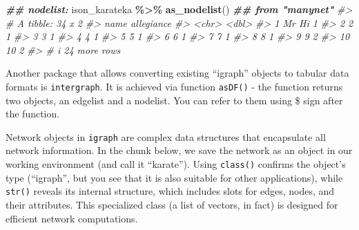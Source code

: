 \documentclass[
]{book}
\newenvironment{Shaded}{\begin{snugshade}}{\end{snugshade}}
\newcommand{\CommentTok}[1]{\textcolor[rgb]{0.56,0.35,0.01}{\textit{#1}}}
\newcommand{\DocumentationTok}[1]{\textcolor[rgb]{0.56,0.35,0.01}{\textbf{\textit{#1}}}}
\newcommand{\FunctionTok}[1]{\textcolor[rgb]{0.13,0.29,0.53}{\textbf{#1}}}
\newcommand{\NormalTok}[1]{#1}
\newcommand{\SpecialCharTok}[1]{\textcolor[rgb]{0.81,0.36,0.00}{\textbf{#1}}}
\begin{document}
\begin{Shaded}
\begin{Highlighting}[]
\DocumentationTok{\#\# nodelist:}
\NormalTok{ison\_karateka }\SpecialCharTok{\%\textgreater{}\%} 
  \FunctionTok{as\_nodelist}\NormalTok{() }\DocumentationTok{\#\# from "manynet"}
\CommentTok{\#\textgreater{} \# A tibble: 34 x 2}
\CommentTok{\#\textgreater{}    name  allegiance}
\CommentTok{\#\textgreater{}    \textless{}chr\textgreater{}      \textless{}dbl\textgreater{}}
\CommentTok{\#\textgreater{}  1 Mr Hi          1}
\CommentTok{\#\textgreater{}  2 2              1}
\CommentTok{\#\textgreater{}  3 3              1}
\CommentTok{\#\textgreater{}  4 4              1}
\CommentTok{\#\textgreater{}  5 5              1}
\CommentTok{\#\textgreater{}  6 6              1}
\CommentTok{\#\textgreater{}  7 7              1}
\CommentTok{\#\textgreater{}  8 8              1}
\CommentTok{\#\textgreater{}  9 9              2}
\CommentTok{\#\textgreater{} 10 10             2}
\CommentTok{\#\textgreater{} \# i 24 more rows}
\end{Highlighting}
\end{Shaded}

Another package that allows converting existing ``igraph'' objects to tabular data formats is \texttt{intergraph}. It is achieved via function \texttt{asDF()} - the function returns two objects, an edgelist and a nodelist. You can refer to them using \$ sign after the function.

\begin{Shaded}
\end{Shaded}

Network objects in \texttt{igraph} are complex data structures that encapsulate all network information. In the chunk below, we save the network as an object in our working environment (and call it ``karate''). Using \texttt{class()} confirms the object's type (``igraph'', but you see that it is also suitable for other applications), while \texttt{str()} reveals its internal structure, which includes slots for edges, nodes, and their attributes. This specialized class (a list of vectors, in fact) is designed for efficient network computations.
\end{document}
